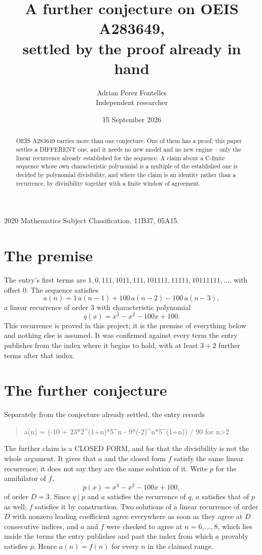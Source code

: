 \documentclass[11pt,a4paper]{article}
\title{A further conjecture on OEIS A283649,\\ \large settled by the proof already in hand}
\author{Adrian Perez Fontelles\\ \small Independent researcher}
\date{15 September 2026}
\theoremstyle{plain}
\theoremstyle{definition}
\begin{document}
\maketitle

\begin{abstract}
OEIS A283649 carries more than one conjecture. One of them has a proof; this paper settles a
DIFFERENT one, and it needs no new model and no new engine -- only the linear recurrence already
established for the sequence. A claim about a C-finite sequence whose own characteristic
polynomial is a multiple of the established one is decided by polynomial divisibility, and where
the claim is an identity rather than a recurrence, by divisibility together with a finite window
of agreement.
\end{abstract}

\noindent\small 2020 Mathematics Subject Classification. 11B37, 05A15.\normalsize

\section{The premise}

The entry's first terms are $1, 0, 111, 1011, 111, 101111, 11111, 10111111,\dots$, with offset $0$. The sequence satisfies
\[
  a(n)=1\,a(n-1) + 100\,a(n-2) - 100\,a(n-3) ,
\]
a linear recurrence of order $3$ with characteristic polynomial
\[
  q(x)=x^{3} - x^{2} - 100 x + 100 .
\]
This recurrence is proved in this project; it is the premise of everything below and nothing else is assumed.
It was confirmed against every term the entry publishes from the index where it begins to hold,
with at least $3+2$ further terms after that index.

\section{The further conjecture}

Separately from the conjecture already settled, the entry records

\begin{quote}\raggedright a(n) = (-10 + 23*2\^{}(1+n)*5\^{}n - 9*(-2)\^{}n*5\^{}(1+n)) / 90 for n>2.\end{quote}

The further claim is a CLOSED FORM, and for that the divisibility is not the whole argument. It
gives that $a$ and the closed form $f$ satisfy the same linear recurrence; it does not say they
are the same solution of it. Write $p$ for the annihilator of $f$,
\[
  p(x)=x^{3} - x^{2} - 100 x + 100 ,
\]
of order $D=3$. Since $q\mid p$ and $a$ satisfies the recurrence of $q$, $a$ satisfies that of
$p$ as well; $f$ satisfies it by construction. Two solutions of a linear recurrence of order $D$
with nonzero leading coefficient agree everywhere as soon as they agree at $D$ consecutive
indices, and $a$ and $f$ were checked to agree at $n=6,\dots,8$,
which lies inside the terms the entry publishes and past the index from which $a$ provably
satisfies $p$. Hence $a(n)=f(n)$ for every $n$ in the claimed range.
\end{document}
